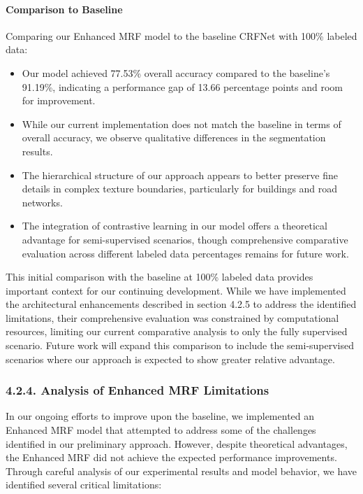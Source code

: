 \documentclass[conference]{IEEEtran}
\begin{document}
\paragraph{Comparison to Baseline}
Comparing our Enhanced MRF model to the baseline CRFNet with 100\% labeled data:

\begin{itemize}
    \item Our model achieved 77.53\% overall accuracy compared to the baseline's 91.19\%, indicating a performance gap of 13.66 percentage points and room for improvement.
    \item While our current implementation does not match the baseline in terms of overall accuracy, we observe qualitative differences in the segmentation results.
    \item The hierarchical structure of our approach appears to better preserve fine details in complex texture boundaries, particularly for buildings and road networks.
    \item The integration of contrastive learning in our model offers a theoretical advantage for semi-supervised scenarios, though comprehensive comparative evaluation across different labeled data percentages remains for future work.
\end{itemize}

This initial comparison with the baseline at 100\% labeled data provides important context for our continuing development. While we have implemented the architectural enhancements described in section 4.2.5 to address the identified limitations, their comprehensive evaluation was constrained by computational resources, limiting our current comparative analysis to only the fully supervised scenario. Future work will expand this comparison to include the semi-supervised scenarios where our approach is expected to show greater relative advantage.


\subsubsection*{4.2.4. Analysis of Enhanced MRF Limitations}

In our ongoing efforts to improve upon the baseline, we implemented an Enhanced MRF model that attempted to address some of the challenges identified in our preliminary approach. However, despite theoretical advantages, the Enhanced MRF did not achieve the expected performance improvements. Through careful analysis of our experimental results and model behavior, we have identified several critical limitations:
\end{document}
